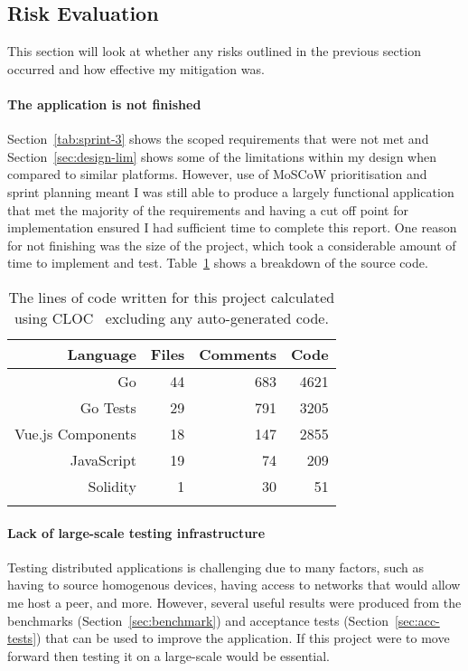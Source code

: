 \subsection*{Risk Evaluation}\label{subsec:risk-reflection}

This section will look at whether any risks outlined in the previous section occurred and how effective my mitigation was.

\paragraph*{The application is not finished}
Section~\ref{tab:sprint-3} shows the scoped requirements that were not met and Section~\ref{sec:design-lim} shows some of the limitations within my design when compared to similar platforms. However, use of MoSCoW prioritisation and sprint planning meant I was still able to produce a largely functional application that met the majority of the requirements and having a cut off point for implementation ensured I had sufficient time to complete this report.
\x
One reason for not finishing was the size of the project, which took a considerable amount of time to implement and test. Table~\ref{tab:cloc} shows a breakdown of the source code.

\begin{longtable}{ r r r r }
  \toprule
  \textbf{Language} & \textbf{Files} & \textbf{Comments} & \textbf{Code}
  \\\midrule\midrule
  Go
  & 44
  & 683
  & 4621
  \\
  Go Tests
  & 29
  & 791
  & 3205
  \\
  Vue.js Components
  & 18
  & 147
  & 2855
  \\
  JavaScript
  & 19
  & 74
  & 209
  \\
  Solidity
  & 1
  & 30
  & 51
  \\\bottomrule\bottomrule
  \caption{The lines of code written for this project calculated using CLOC~\cite{noauthor_aldanialcloc_nodate} excluding any auto-generated code.}
  \label{tab:cloc}
\end{longtable}

\paragraph*{Lack of large-scale testing infrastructure}
Testing distributed applications is challenging due to many factors, such as having to source homogenous devices, having access to networks that would allow me host a peer, and more. However, several useful results were produced from the benchmarks (Section~\ref{sec:benchmark}) and acceptance tests (Section~\ref{sec:acc-tests}) that can be used to improve the application. If this project were to move forward then testing it on a large-scale would be essential.